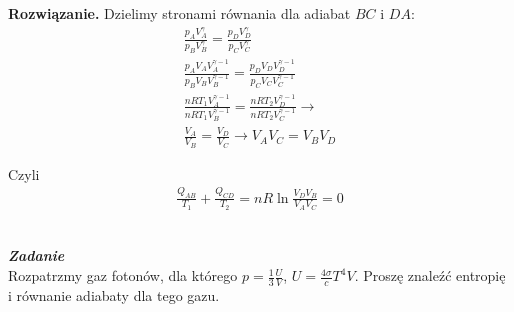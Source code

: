 \documentclass[11pt,a4paper]{article}
\newcounter{zadanie}\newcommand{\zadanie}[1][]{\addtocounter{zadanie}{1} ~\\ {\bf \emph{Zadanie \arabic{zadanie} #1 }} \\}
\newenvironment{solution}{\vspace{1cm} \par\textbf{Rozwiązanie.} \vspace{1cm}}{}
\begin{document}
\begin{solution}
Dzielimy stronami równania dla adiabat $BC$ i $DA$:
\begin{align*}
  \frac{p_A V_A^{\gamma}}{p_B V_B^{\gamma}} = \frac{p_D V_D^{\gamma}}{p_C V_C^{\gamma}} \\
  \frac{p_A V_A V_A^{\gamma-1}}{p_B V_B V_B^{\gamma-1}} = \frac{p_D V_D V_D^{\gamma-1}}{p_C V_C V_C^{\gamma-1}} \\
  \frac{n R T_1 V_A^{\gamma-1}}{n R T_1 V_B^{\gamma-1}} = \frac{n R T_2 V_D^{\gamma-1}}{n R T_2 V_C^{\gamma-1}} \to \\
  \frac{V_A}{V_B} = \frac{V_D}{V_C} \to V_A V_C = V_B V_D
\end{align*}

Czyli
\begin{align*}
  \frac{Q_{AB}}{T_1} + \frac{Q_{CD}}{T_2} = n R \ln \frac{V_D V_B}{V_A V_C} = 0
\end{align*}


\newpage   
\end{solution}
\zadanie[]

Rozpatrzmy gaz fotonów, dla którego $p = \frac{1}{3}\frac{U}{V}$, 
$U = \frac{4\sigma}{c} T^4V$. Proszę znaleźć entropię
i równanie adiabaty dla tego gazu.
 
\end{document}
